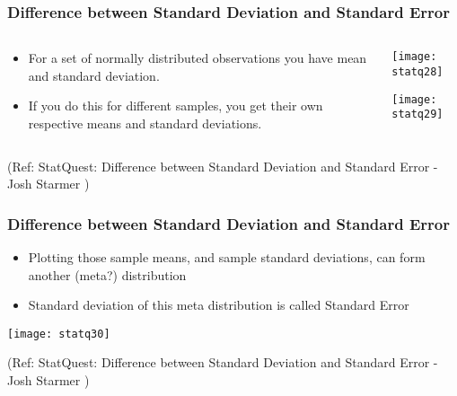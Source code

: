 %
\begin{frame}[fragile]\frametitle{Difference between Standard Deviation and Standard Error}
\begin{columns}
    \begin{column}[T]{0.6\linewidth}
	\begin{itemize}
	\item For a set of normally distributed observations you have mean and standard deviation.
	\item If you do this for different samples, you get their own respective means and standard deviations.
	\end{itemize}

    \end{column}
    \begin{column}[T]{0.4\linewidth}
      \begin{center}
      \texttt{[image: statq28]}
	  
	  \texttt{[image: statq29]}
	   
	  	\end{center}
    \end{column}

  \end{columns}
  
\tiny{(Ref: StatQuest: Difference between Standard Deviation and Standard Error - Josh Starmer )}
\end{frame}

\begin{frame}[fragile]\frametitle{Difference between Standard Deviation and Standard Error}

	\begin{itemize}
	\item Plotting those sample means, and sample standard deviations, can form another (meta?) distribution
	\item Standard deviation of this meta distribution is called Standard Error
	\end{itemize}

      \begin{center}
      \texttt{[image: statq30]}
	\end{center}

  
\tiny{(Ref: StatQuest: Difference between Standard Deviation and Standard Error - Josh Starmer )}
\end{frame}

